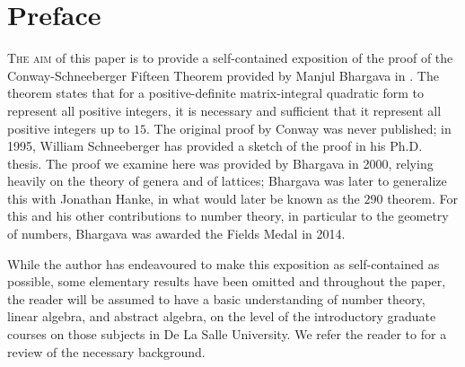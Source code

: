 \chapter*{Preface}

{\scshape The aim} of this paper is to provide a self-contained exposition of
the proof of the Conway-Schneeberger Fifteen Theorem provided by Manjul Bhargava
in \cite{bhargava2000conway}. The theorem states that for a positive-definite
matrix-integral quadratic form to represent all positive integers, it is
necessary and sufficient that it represent all positive integers up to \(15\).
The original proof by Conway was never published; in 1995, William Schneeberger
has provided a sketch of the proof in his Ph.D. thesis.
\cite{schneeberger1997arithmetic} The proof we examine here was provided by
Bhargava in 2000, relying heavily on the theory of genera and of lattices;
Bhargava was later to generalize this with Jonathan Hanke, in what would later
be known as the \(290\) theorem. \cite{bhargava2005universal} For this and his
other contributions to number theory, in particular to the geometry of numbers,
Bhargava was awarded the Fields Medal in 2014. \cite{bhargava2014fields}

While the author has endeavoured to make this exposition as self-contained as
possible, some elementary results have been omitted and throughout the paper,
the reader will be assumed to have a basic understanding of number theory,
linear algebra, and abstract algebra, on the level of the introductory graduate
courses on those subjects in De La Salle University. We refer the reader to
\cite{dudley1978elementary,halmos1942vector,hungerford2012algebra} for a review
of the necessary background.

